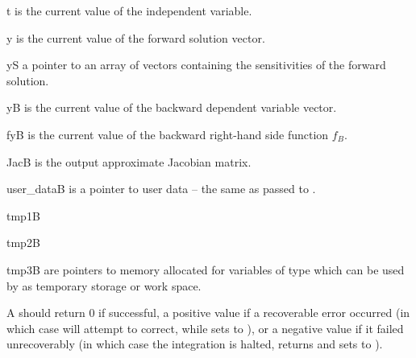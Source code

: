 {
  \begin{args}
  \item[t]
    is the current value of the independent variable.
  \item[y]
    is the current value of the forward solution vector.
  \item[yS]
    a pointer to an array of  vectors containing the sensitivities
    of the forward solution.
  \item[yB]
    is the current value of the backward dependent variable vector.
  \item[fyB]
    is the current value of the backward right-hand side function $f_B$.
  \item[JacB]
    is the output approximate Jacobian matrix.
  \item[user\_dataB]
    is a pointer to user data -- the same as passed to .
  \item[tmp1B]
  \item[tmp2B]
  \item[tmp3B]
    are pointers to memory allocated  for variables of type  which
    can be used by  as temporary storage or work space.
  \end{args}
}
{
  A  should return 0 if successful, a positive value if a recoverable
  error occurred (in which case {\cvodes} will attempt to correct, while {\cvls} sets
   to ), or a negative
  value if it failed unrecoverably (in which case the integration is halted, 
  returns  and {\cvls} sets  to
  ).
}
